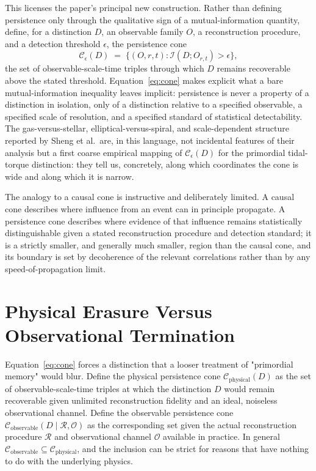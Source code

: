 \documentclass[11pt]{article}
\begin{document}
This licenses the paper's principal new construction. Rather than defining persistence only through the qualitative sign of a mutual-information quantity, define, for a distinction $D$, an observable family $O$, a reconstruction procedure, and a detection threshold $\epsilon$, the persistence cone
\begin{equation}
\mathcal C_\epsilon(D) \;=\; \big\{ (O, r, t) : \mathcal I\!\left(D; O_{r,t}\right) > \epsilon \big\},
\label{eq:cone}
\end{equation}
the set of observable-scale-time triples through which $D$ remains recoverable above the stated threshold. Equation~\eqref{eq:cone} makes explicit what a bare mutual-information inequality leaves implicit: persistence is never a property of a distinction in isolation, only of a distinction relative to a specified observable, a specified scale of resolution, and a specified standard of statistical detectability. The gas-versus-stellar, elliptical-versus-spiral, and scale-dependent structure reported by Sheng et al.\ are, in this language, not incidental features of their analysis but a first coarse empirical mapping of $\mathcal C_\epsilon(D)$ for the primordial tidal-torque distinction: they tell us, concretely, along which coordinates the cone is wide and along which it is narrow.

The analogy to a causal cone is instructive and deliberately limited. A causal cone describes where influence from an event can in principle propagate. A persistence cone describes where evidence of that influence remains statistically distinguishable given a stated reconstruction procedure and detection standard; it is a strictly smaller, and generally much smaller, region than the causal cone, and its boundary is set by decoherence of the relevant correlations rather than by any speed-of-propagation limit.

\section{Physical Erasure Versus Observational Termination}

Equation~\eqref{eq:cone} forces a distinction that a looser treatment of "primordial memory" would blur. Define the physical persistence cone $\mathcal C_{\mathrm{physical}}(D)$ as the set of observable-scale-time triples at which the distinction $D$ would remain recoverable given unlimited reconstruction fidelity and an ideal, noiseless observational channel. Define the observable persistence cone $\mathcal C_{\mathrm{observable}}(D \mid \mathcal R, \mathcal O)$ as the corresponding set given the actual reconstruction procedure $\mathcal R$ and observational channel $\mathcal O$ available in practice. In general $\mathcal C_{\mathrm{observable}} \subseteq \mathcal C_{\mathrm{physical}}$, and the inclusion can be strict for reasons that have nothing to do with the underlying physics.
\end{document}
